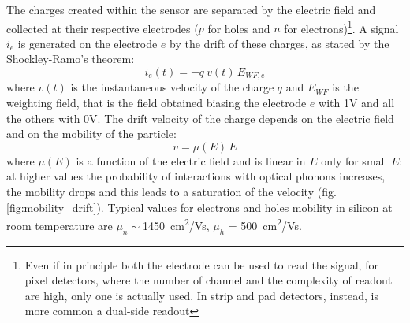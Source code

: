    The charges created within the sensor are separated by the electric field and collected at their respective electrodes ($p$ for holes and $n$ for electrons)\footnote{Even if in principle both the electrode can be used to read the signal, for pixel detectors, where the number of channel and the complexity of readout are high, only one is actually used. In strip and pad detectors, instead, is more common a dual-side readout}. A signal $i_e$ is generated on the electrode $e$  by the drift of these charges, as stated by the Shockley-Ramo's theorem: 
   \begin{equation}
        i_e(t) = -q\: v(t)\, E_{WF,e}
   \end{equation}
   where $v(t)$ is the instantaneous velocity of the charge $q$ and $E_{WF}$ is the weighting field, that is the field obtained biasing the electrode $e$ with 1V and all the others with 0V. The drift velocity of the charge depends on the electric field and on the mobility of the particle:
   \begin{equation}
      v = \mu(E)\, E
   \end{equation}
   where $\mu(E)$ is a function of the electric field and is linear in $E$ only for small $E$: at higher values the probability of interactions with optical phonons increases, the mobility drops and this leads to a saturation of the velocity (fig. \ref{fig:mobility_drift}). Typical values for electrons and holes mobility in silicon at room temperature are $\mu _n \sim$\SI{1450}{cm\squared/Vs}, $\mu _h$ = \SI{500}{cm\squared/Vs}.
